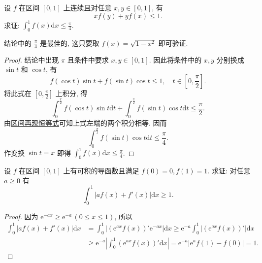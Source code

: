 \documentclass[../../main.tex]{subfiles}
\begin{document}
\begin{example}
设 $f$ 在区间 $[0,1]$ 上连续且对任意 $x,y\in[0,1]$, 有
$$xf(y)+yf(x)\leqslant 1.$$
求证: $\int_0^1 f(x)\mathrm{d}x\leqslant \frac{\pi}{4}$.
\end{example}
\begin{remark}
结论中的 $\frac{\pi}{4}$ 是最佳的, 这只要取 $f(x)=\sqrt{1-x^2}$ 即可验证.
\end{remark}
\begin{proof}
结论中出现 $\pi$ 且条件中要求 $x,y\in[0,1]$. 因此将条件中的 $x,y$ 分别换成 $\sin t$ 和 $\cos t$, 有
$$f(\cos t)\sin t+f(\sin t)\cos t\leqslant 1,\quad t\in\left[0,\frac{\pi}{2}\right].$$
将此式在 $\left[0,\frac{\pi}{2}\right]$ 上积分, 得
$$\int_0^{\frac{\pi}{2}}f(\cos t)\sin t\mathrm{d}t+\int_0^{\frac{\pi}{2}}f(\sin t)\cos t\mathrm{d}t\leqslant \frac{\pi}{2}.$$
由\hyperref[theorem:区间再现恒等式]{区间再现恒等式}可知上式左端的两个积分相等. 因而
$$\int_0^{\frac{\pi}{2}}f(\sin t)\cos t\mathrm{d}t\leqslant \frac{\pi}{4}.$$
作变换 $\sin t=x$ 即得 $\int_0^1 f(x)\mathrm{d}x\leqslant \frac{\pi}{4}$.

\end{proof}

\begin{example}
设 $f$ 在区间 $[0,1]$ 上有可积的导函数且满足 $f(0)=0,f(1)=1$. 求证: 对任意 $a\geqslant 0$ 有
$$\int_0^1|af(x)+f'(x)|\mathrm{d}x\geqslant 1.$$
\end{example}
\begin{proof}
因为 $\mathrm{e}^{-ax}\geqslant \mathrm{e}^{-a}\,(0\leqslant  x\leqslant 1)$, 所以
$$
\begin{aligned}
\int_0^1|af(x)+f'(x)|\mathrm{d}x &= \int_0^1|(\mathrm{e}^{ax}f(x))'\mathrm{e}^{-ax}|\mathrm{d}x \geqslant  \mathrm{e}^{-a}\int_0^1|(\mathrm{e}^{ax}f(x))'|\mathrm{d}x \\
&\geqslant  \mathrm{e}^{-a}\left|\int_0^1(\mathrm{e}^{ax}f(x))'\mathrm{d}x\right| = \mathrm{e}^{-a}|\mathrm{e}^{a}f(1)-f(0)| = 1.
\end{aligned}
$$

\end{proof}
\end{document}
